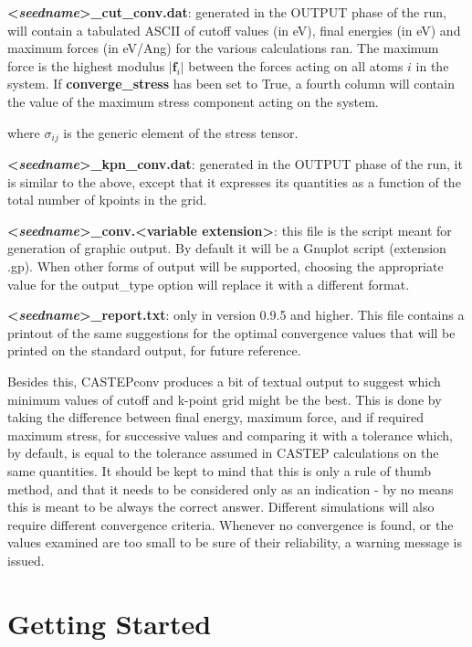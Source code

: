 \documentclass[10pt]{article}
\begin{document}
\textbf{\textless \textit{seedname}\textgreater\_cut\_conv.dat}: generated in 
the OUTPUT phase of the run, will contain a tabulated ASCII of cutoff values (in 
eV), final energies (in eV) and maximum forces (in eV/Ang) for the various 
calculations ran. The maximum force is the highest modulus $|\mathbf{f}_i|$ 
between the forces acting on all atoms $i$ in the system. If 
\textbf{converge\_stress} has been set to True, a fourth column will contain the 
value of the maximum stress component acting on the system.

where $\sigma_{ij}$ is the generic element of the stress tensor.

\textbf{\textless \textit{seedname}\textgreater\_kpn\_conv.dat}: generated in 
the OUTPUT phase of the run, it is similar to the above, except that it 
expresses its quantities as a function of the total number of kpoints in the 
grid.

\textbf{\textless \textit{seedname}\textgreater\_conv.\textless variable 
extension\textgreater}: this file is the script meant for generation of graphic 
output. By default it will be a Gnuplot script (extension .gp). When other forms 
of output will be supported, choosing the appropriate value for the output\_type 
option will replace it with a different format.

\textbf{\textless \textit{seedname}\textgreater\_report.txt}: only in version 0.9.5 and higher. This file contains a printout of the same suggestions for the optimal convergence values that will be printed on the standard output, for future reference.

Besides this, CASTEPconv produces a bit of textual output to suggest which 
minimum values of cutoff and k-point grid might be the best. This is done by 
taking the difference between final energy, maximum force, and if required 
maximum stress, for successive values and comparing it with a tolerance which, 
by default, is equal to the tolerance assumed in CASTEP calculations on the same 
quantities. It should be kept to mind that this is only a rule of thumb method, 
and that it needs to be considered only as an indication - by no means this is 
meant to be always the correct answer. Different simulations will also require 
different convergence criteria. Whenever no convergence is found, or the values 
examined are too small to be sure of their reliability, a warning message is 
issued.

\section{Getting Started}
\end{document}
